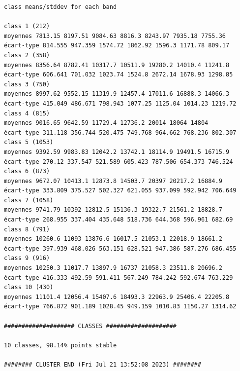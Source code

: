 \documentclass[land,article,submit,pdftex,moreauthors]{Definitions/mdpi}
\begin{document}
\begin{scriptsize}
\begin{verbatim}
class means/stddev for each band

class 1 (212)
moyennes 7813.15 8197.51 9084.63 8816.3 8243.97 7935.18 7755.36
écart-type 814.555 947.359 1574.72 1862.92 1596.3 1171.78 809.17
class 2 (358)
moyennes 8356.64 8782.41 10317.7 10511.9 19280.2 14010.4 11241.8
écart-type 606.641 701.032 1023.74 1524.8 2672.14 1678.93 1298.85
class 3 (750)
moyennes 8997.62 9552.15 11319.9 12457.4 17011.6 16888.3 14066.3
écart-type 415.049 486.671 798.943 1077.25 1125.04 1014.23 1219.72
class 4 (815)
moyennes 9016.65 9642.59 11729.4 12736.2 20014 18064 14804
écart-type 311.118 356.744 520.475 749.768 964.662 768.236 802.307
class 5 (1053)
moyennes 9392.59 9983.83 12042.2 13742.1 18114.9 19491.5 16715.9
écart-type 270.12 337.547 521.589 605.423 787.506 654.373 746.524
class 6 (873)
moyennes 9672.07 10413.1 12873.8 14503.7 20397 20217.2 16884.9
écart-type 333.809 375.527 502.327 621.055 937.099 592.942 706.649
class 7 (1058)
moyennes 9741.79 10392 12812.5 15136.3 19322.7 21561.2 18828.7
écart-type 268.955 337.404 435.648 518.736 644.368 596.961 682.69
class 8 (791)
moyennes 10260.6 11093 13876.6 16017.5 21053.1 22018.9 18661.2
écart-type 397.939 468.026 563.151 628.521 947.386 587.276 686.455
class 9 (916)
moyennes 10250.3 11017.7 13897.9 16737 21058.3 23511.8 20696.2
écart-type 416.333 492.59 591.411 567.249 784.242 592.674 763.229
class 10 (430)
moyennes 11101.4 12056.4 15407.6 18493.3 22963.9 25406.4 22205.8
écart-type 766.872 901.189 1028.45 949.159 1010.83 1150.27 1314.62

#################### CLASSES ####################

10 classes, 98.14% points stable

######## CLUSTER END (Fri Jul 21 13:52:08 2023) ########

\end{verbatim}
\end{scriptsize}
\end{document}
